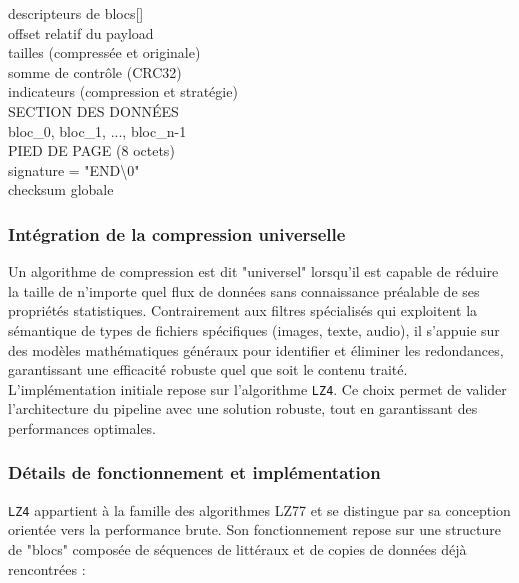 \documentclass{article}
\begin{document}
\begin{center}
{{  \hspace*{1.5em}descripteurs de blocs[]\\
  \hspace*{3em}offset relatif du payload\\
  \hspace*{3em}tailles (compressée et originale)\\
  \hspace*{3em}somme de contrôle (CRC32)\\
  \hspace*{3em}indicateurs (compression et stratégie)\\[0.5em]
  SECTION DES DONNÉES\\
  \hspace*{1.5em}bloc\_0, bloc\_1, ..., bloc\_n-1\\[0.5em]
  PIED DE PAGE (8 octets)\\
  \hspace*{1.5em}signature = "END\textbackslash0"\\
  \hspace*{1.5em}checksum globale%
  }}
  \end{center}

\subsubsection{Intégration de la compression universelle}

Un algorithme de compression est dit "universel" lorsqu'il est capable de réduire la taille de n'importe quel flux de données sans connaissance préalable de ses propriétés statistiques. Contrairement aux filtres spécialisés qui exploitent la sémantique de types de fichiers spécifiques (images, texte, audio), il s'appuie sur des modèles mathématiques généraux pour identifier et éliminer les redondances, garantissant une efficacité robuste quel que soit le contenu traité.
\newline\newline
L'implémentation initiale repose sur l'algorithme \texttt{LZ4}. Ce choix permet de valider l'architecture du pipeline avec une solution robuste, tout en garantissant des performances optimales.


\subsubsection*{Détails de fonctionnement et implémentation}

\texttt{LZ4} appartient à la famille des algorithmes LZ77 et se distingue par sa conception orientée vers la performance brute. Son fonctionnement repose sur une structure de "blocs" composée de séquences de littéraux et de copies de données déjà rencontrées :
\end{document}
